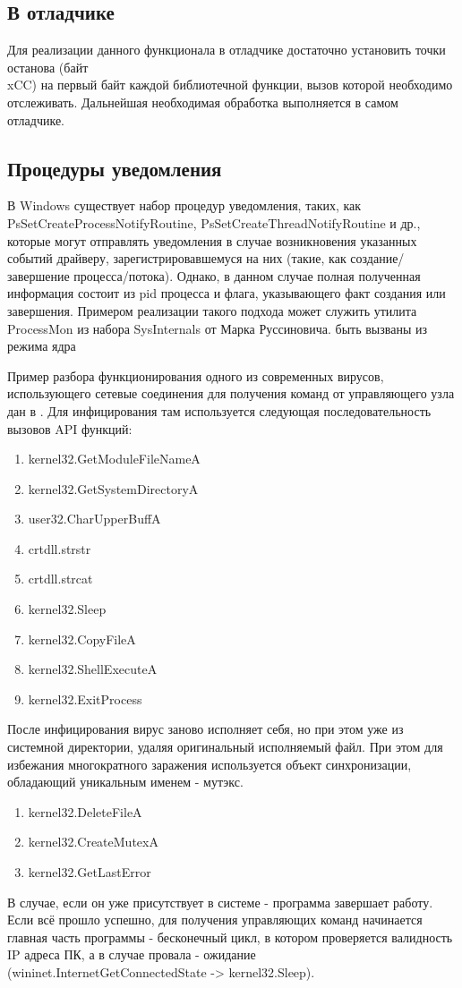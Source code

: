 \subsection {В отладчике}
Для реализации данного функционала в отладчике достаточно установить точки останова (байт \\xCC) на первый байт каждой библиотечной функции, вызов которой необходимо отслеживать. Дальнейшая необходимая обработка выполняется в самом отладчике.
\subsection {Процедуры уведомления}
В Windows существует набор процедур уведомления, таких, как\\
PsSetCreateProcessNotifyRoutine, PsSetCreateThreadNotifyRoutine и др., которые могут отправлять уведомления в случае возникновения указанных событий драйверу, зарегистрировавшемуся на них (такие, как создание/завершение процесса/потока). Однако, в данном случае полная полученная информация состоит из pid процесса и флага, указывающего факт создания или завершения. Примером реализации такого подхода может служить утилита ProcessMon из набора SysInternals от Марка Руссиновича.
быть вызваны из режима ядра

Пример разбора функционирования одного из современных вирусов, использующего сетевые соединения для
получения команд от управляющего узла дан в \cite{REVERSING}. Для инфицирования там используется следующая последовательность вызовов API функций:
\begin {enumerate}
	\item kernel32.GetModuleFileNameA
	\item kernel32.GetSystemDirectoryA
	\item user32.CharUpperBuffA
	\item crtdll.strstr
	\item crtdll.strcat
	\item kernel32.Sleep
	\item kernel32.CopyFileA
	\item kernel32.ShellExecuteA
	\item kernel32.ExitProcess
\end {enumerate}
После инфицирования вирус заново исполняет себя, но при этом уже из системной директории, удаляя оригинальный
исполняемый файл. При этом для избежания многократного заражения используется объект синхронизации, обладающий уникальным именем - мутэкс.
\begin {enumerate}
	\item kernel32.DeleteFileA
	\item kernel32.CreateMutexA
	\item kernel32.GetLastError
\end {enumerate}
В случае, если он уже присутствует в системе - программа завершает работу. Если всё прошло успешно, для получения управляющих команд начинается главная часть программы - бесконечный цикл, в котором проверяется валидность IP адреса
ПК, а в случае провала - ожидание (wininet.InternetGetConnectedState -> kernel32.Sleep).